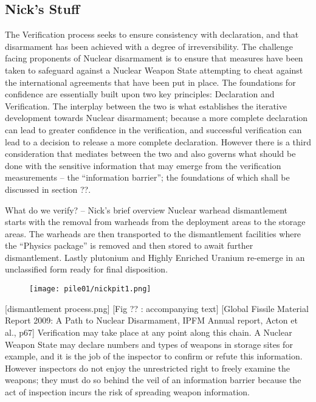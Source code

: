 \documentclass[twoside,titlepage,11pt,twocolumn,a4paper]{article}
\begin{document}
\subsection{Nick's Stuff}
The Verification process seeks to ensure consistency with declaration,
and that disarmament has been achieved with a degree of
irreversibility.  The challenge facing proponents of Nuclear
disarmament is to ensure that measures have been taken to safeguard
against a Nuclear Weapon State attempting to cheat against the
international agreements that have been put in place. The foundations
for confidence are essentially built upon two key principles:
Declaration and Verification. The interplay between the two is what
establishes the iterative development towards Nuclear disarmament;
because a more complete declaration can lead to greater confidence in
the verification, and successful verification can lead to a decision
to release a more complete declaration. However there is a third
consideration that mediates between the two and also governs what
should be done with the sensitive information that may emerge from the
verification measurements -- the ``information barrier''; the
foundations of which shall be discussed in section ??.

What do we verify? -- Nick’s brief overview Nuclear warhead
dismantlement starts with the removal from warheads from the
deployment areas to the storage areas. The warheads are then
transported to the dismantlement facilities where the ``Physics
package'' is removed and then stored to await further
dismantlement. Lastly plutonium and Highly Enriched Uranium re-emerge
in an unclassified form ready for final disposition.

\begin{figure}
  \texttt{[image: pile01/nickpit1.png]}
\end{figure}

[dismantlement process.png] [Fig ?? : accompanying text] [Global
  Fissile Material Report 2009: A Path to Nuclear Disarmament, IPFM
  Annual report, Acton et al., p67] Verification may take place at any
point along this chain. A Nuclear Weapon State may declare numbers and
types of weapons in storage sites for example, and it is the job of
the inspector to confirm or refute this information.  However
inspectors do not enjoy the unrestricted right to freely examine the
weapons; they must do so behind the veil of an information barrier
because the act of inspection incurs the risk of spreading weapon
information.
\end{document}
